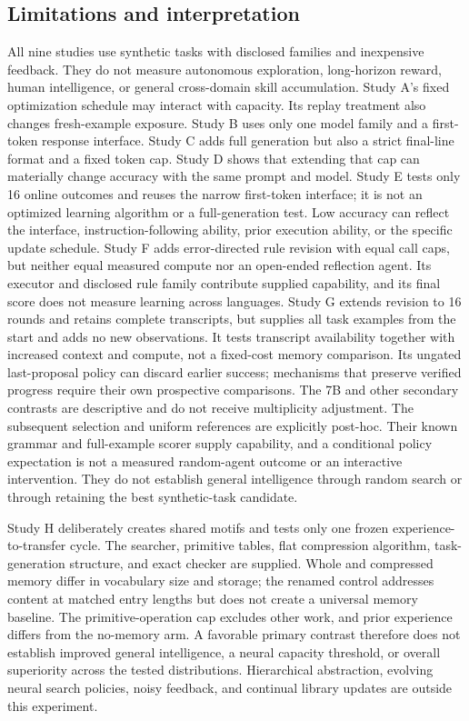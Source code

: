 \documentclass[11pt]{article}
\begin{document}
\subsection{Limitations and interpretation}
All nine studies use synthetic tasks with disclosed families and inexpensive
feedback. They do not measure autonomous exploration, long-horizon reward,
human intelligence, or general cross-domain skill accumulation. Study A's
fixed optimization schedule may interact with capacity. Its replay treatment
also changes fresh-example exposure. Study B uses only one model family and
a first-token response interface. Study C adds full generation but also a
strict final-line format and a fixed token cap. Study D shows that extending that cap can materially
change accuracy with the same prompt and model. Study E tests only 16 online
outcomes and reuses the narrow first-token interface; it is not an optimized
learning algorithm or a full-generation test. Low accuracy can reflect the
interface, instruction-following ability, prior execution ability, or the
specific update schedule. Study F adds error-directed rule revision with
equal call caps, but neither equal measured compute nor an open-ended
reflection agent. Its executor and disclosed rule family contribute supplied
capability, and its final score does not measure learning across languages.
Study G extends revision to 16 rounds and retains complete transcripts,
but supplies all task examples from the start and adds no new observations.
It tests transcript availability together with increased context and compute,
not a fixed-cost memory comparison. Its ungated last-proposal policy can
discard earlier success; mechanisms that preserve verified progress require
their own prospective comparisons. The 7B and other secondary contrasts are
descriptive and do not receive multiplicity adjustment.
The subsequent selection and uniform references are explicitly post-hoc.
Their known grammar and full-example scorer supply capability, and a
conditional policy expectation is not a measured random-agent outcome or
an interactive intervention. They do not establish general intelligence
through random search or through retaining the best synthetic-task candidate.

Study H deliberately creates shared motifs and tests only one frozen
experience-to-transfer cycle. The searcher, primitive tables, flat compression
algorithm, task-generation structure, and exact checker are supplied. Whole
and compressed memory differ in vocabulary size and storage; the renamed
control addresses content at matched entry lengths but does not create a
universal memory baseline. The primitive-operation cap excludes other work,
and prior experience differs from the no-memory arm. A favorable primary
contrast therefore does not establish improved general intelligence, a neural
capacity threshold, or overall superiority across the tested distributions.
Hierarchical abstraction, evolving neural search policies, noisy feedback,
and continual library updates are outside this experiment.
\end{document}
